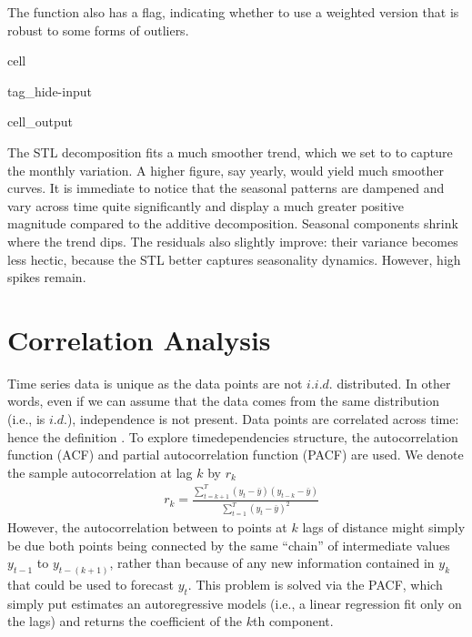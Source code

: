 \documentclass[letterpaper,10pt,english]{jupyterBook}
\begin{document}
\sphinxAtStartPar
The function also has a  flag, indicating whether to use a weighted version that is robust to some forms of outliers.

\begin{sphinxuseclass}{cell}
\begin{sphinxuseclass}{tag_hide-input}
\begin{sphinxuseclass}{cell_output}
\noindent{}

\end{sphinxuseclass}
\end{sphinxuseclass}
\end{sphinxuseclass}
\sphinxAtStartPar
The STL decomposition fits a much smoother trend, which we set to  to capture the monthly variation. A higher figure, say yearly, would yield much smoother curves. It is immediate to notice that the seasonal patterns are dampened and vary across time quite significantly and display a much greater positive magnitude compared to the additive decomposition. Seasonal components shrink where the trend dips. The residuals also slightly improve: their variance becomes less hectic, because the STL better captures seasonality dynamics. However, high spikes remain.


\section{Correlation Analysis}
\label{\detokenize{05-time_series_analysis:correlation-analysis}}
\sphinxAtStartPar
Time series data is unique as the data points are not \(i.i.d.\) distributed. In other words, even if we can assume that the data comes from the same distribution (i.e., is \(i.d.\)), independence is not present. Data points are correlated across time: hence the definition . To explore time\sphinxhyphen{}dependencies structure, the auto\sphinxhyphen{}correlation function (ACF) and partial auto\sphinxhyphen{}correlation function (PACF) are used. We denote the sample autocorrelation at lag \(k\) by \(r_k\)
\label{equation:05-time_series_analysis:0cfe26f2-8167-494f-9860-6328ad38e188}\begin{align}
&r_k = \frac{\sum_{t=k+1}^T (y_t-\bar{y})(y_{t-k}-\bar{y})}{\sum_{t=1}^T (y_t-\bar{y})^2}
\end{align}
\sphinxAtStartPar
However, the autocorrelation between to points at \(k\) lags of distance might simply be due both points being connected by the same “chain” of intermediate values \(y_{t-1}\) to \(y_{t-(k+1)}\), rather than because of any new information contained in  \(y_k\)  that could be used to forecast \(y_t\). This problem is solved via the PACF, which \sphinxhyphen{} simply put \sphinxhyphen{} estimates an autoregressive models (i.e., a linear regression fit only on the lags) and returns the coefficient of the \(k\)th component.
\end{document}
